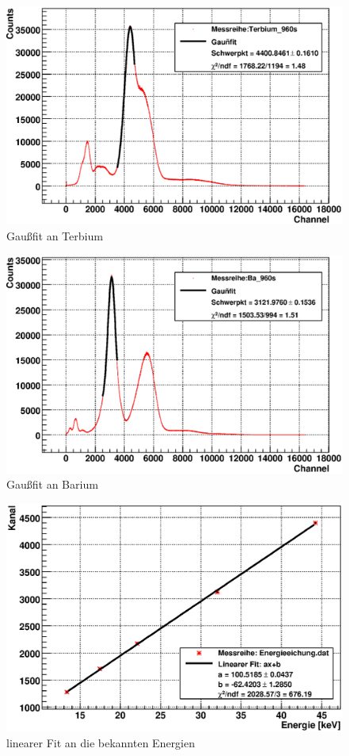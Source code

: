 \documentclass[12pt]{article}
\begin{document}
\begin{figure}[H]
 \includegraphics[width=0.9\linewidth]{pictures/eichung_terbium.eps}
 \caption{Gaußfit an Terbium}
\end{figure}
\begin{figure}[H]
 \includegraphics[width=0.9\linewidth]{pictures/eichung_barium.eps}
 \caption{Gaußfit an Barium}
\end{figure}
\begin{figure}[H]
 \includegraphics[width=0.9\linewidth]{pictures/eichung_linear.eps}
 \caption{linearer Fit an die bekannten Energien}
\end{figure}
\end{document}
